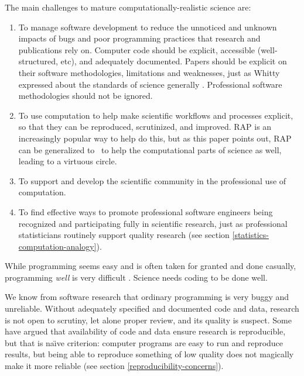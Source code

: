 \documentclass{comjnl}
\begin{document}
The main challenges to mature computationally-realistic science are:

\begin{enumerate}\raggedright
\itemsep=1.5ex

\item 
To manage software development to reduce the unnoticed and unknown impacts of bugs and poor programming practices that research and publications rely on. Computer code should be explicit, accessible (well-structured, etc), and adequately documented. Papers should be explicit on their software methodologies, limitations and weaknesses, just as Whitty expressed about the standards of science generally \cite{whitty}. Professional software methodologies should not be ignored.

\item 
To use computation to help make scientific workflows and processes explicit, so that they can be reproduced, scrutinized, and improved. RAP is an increasingly popular way to help do this, but as this paper points out, RAP can be generalized to \RAPstar\ to help the computational parts of science as well, leading to a virtuous circle.

\item
To support and develop the scientific community in the professional use of computation.

\item
To find effective ways to promote professional software engineers being recognized and participating fully in scientific research, just as professional statisticians routinely support quality research (see section \ref{statistics-computation-analogy}).
\end{enumerate}

While programming seems easy and is often taken for granted and done casually, programming \emph{well\/} is very difficult \cite{fixit}. Science needs coding to be done well. 

We know from software research that ordinary programming is very buggy and unreliable. Without adequately specified and documented code and data, research is not open to scrutiny, let alone proper review, and its quality is suspect. Some have argued that availability of code and data ensure research is reproducible, but that is na\"\i ve criterion: computer programs are easy to run and reproduce results, but being able to reproduce something of low quality does not magically make it more reliable \cite{reproducibility,relit,popper-conjectures-refutations} (see section \ref{reproducibility-concerns}). 
\end{document}
